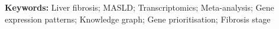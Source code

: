 \documentclass[11pt,a4paper]{article}
\begin{document}


\textbf{Keywords:} Liver fibrosis; MASLD; Transcriptomics; Meta-analysis; Gene expression patterns; Knowledge graph; Gene prioritisation; Fibrosis stage

\end{document}
